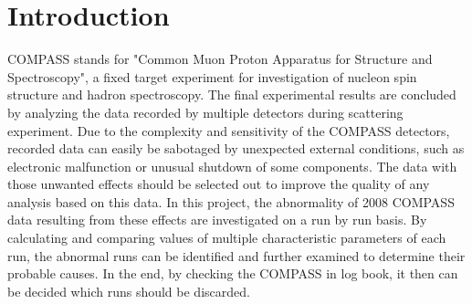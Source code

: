 \section{Introduction}
COMPASS stands for "Common Muon Proton Apparatus for Structure and Spectroscopy", a fixed target experiment for investigation of nucleon spin structure and hadron spectroscopy. The final experimental results are concluded by analyzing the data recorded by multiple detectors during scattering experiment. Due to the complexity and sensitivity of the COMPASS detectors, recorded data can easily be sabotaged by unexpected external conditions, such as electronic malfunction or unusual shutdown of some components. The data with those unwanted effects should be selected out to improve the quality of any analysis based on this data. In this project, the abnormality of 2008 COMPASS data resulting from these effects are investigated on a run by run basis. By calculating and comparing values of multiple characteristic parameters of each run, the abnormal runs can be identified and further examined to determine their probable causes. In the end, by checking the COMPASS in log book, it then can be decided which runs should be discarded.
